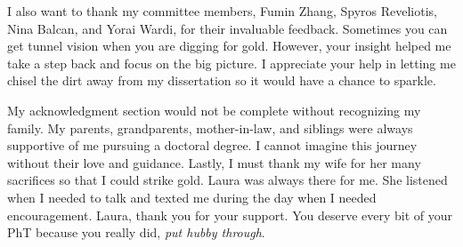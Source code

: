 I also want to thank my committee members, Fumin Zhang, Spyros Reveliotis, Nina Balcan, and Yorai Wardi, for their invaluable feedback.
Sometimes you can get tunnel vision when you are digging for gold.
However, your insight helped me take a step back and focus on the big picture.
I appreciate your help in letting me chisel the dirt away from my dissertation so it would have a chance to sparkle.

My acknowledgment section would not be complete without recognizing my family.
My parents, grandparents, mother-in-law, and siblings were always supportive of me pursuing a doctoral degree.
I cannot imagine this journey without their love and guidance.
Lastly, I must thank my wife for her many sacrifices so that I could strike gold.
Laura was always there for me.
She listened when I needed to talk and texted me during the day when I needed encouragement.
Laura, thank you for your support.
You deserve every bit of your PhT because you really did, \emph{put hubby through}.

